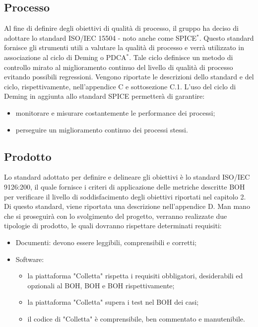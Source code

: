 \subsection{Processo}
Al fine di definire degli obiettivi di qualità di processo, il gruppo ha deciso di adottare lo standard ISO/IEC 15504 - noto anche come SPICE$^*$. Questo standard fornisce gli strumenti utili a valutare la qualità di processo e verrà utilizzato in associazione al ciclo di Deming o PDCA$^*$. Tale ciclo definisce un metodo di controllo mirato al miglioramento continuo del livello di qualità di processo evitando possibili regressioni. 
Vengono riportate le descrizioni dello standard e del ciclo, rispettivamente, nell'appendice C e sottosezione C.1. 
L'uso del ciclo di Deming in aggiunta allo standard SPICE permetterà di garantire:
\begin{itemize}
	\item monitorare e misurare costantemente le performance dei processi;
	\item perseguire un miglioramento continuo dei processi stessi.
\end{itemize}

\subsection{Prodotto}
Lo standard adottato per definire e delineare gli obiettivi è lo standard ISO/IEC 9126:200, il quale fornisce i criteri di applicazione delle metriche descritte BOH per verificare il livello di soddisfacimento degli obiettivi riportati nel capitolo 2. 
Di questo standard, viene riportata una descrizione nell'appendice D.
Man mano che si proseguirà con lo svolgimento del progetto, verranno realizzate due tipologie di prodotto, le quali dovranno rispettare determinati requisiti:
\begin{itemize}
	\item Documenti: devono essere leggibili, comprensibili e corretti;
	\item Software: 
	\begin{itemize}
		\item la piattaforma "Colletta" rispetta i requisiti obbligatori, desiderabili ed opzionali al BOH, BOH e BOH rispettivamente;
		\item la piattaforma "Colletta" supera i test nel BOH dei casi;
		\item il codice di "Colletta" è comprensibile, ben commentato e manutenibile.
	\end{itemize}
\end{itemize}

